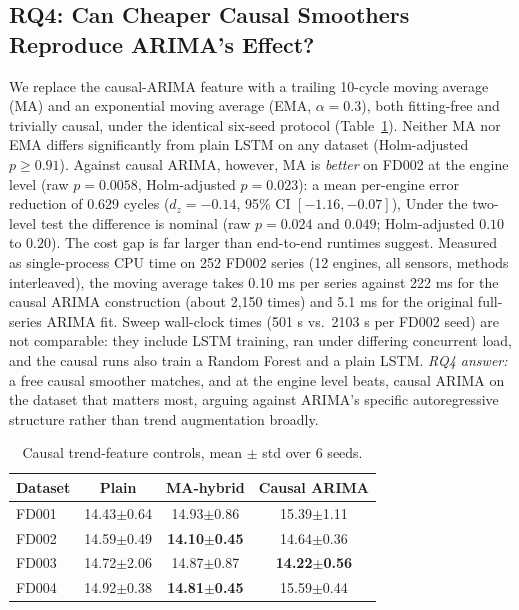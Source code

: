 \documentclass[conference]{IEEEtran}
\begin{document}
\subsection{RQ4: Can Cheaper Causal Smoothers Reproduce ARIMA's Effect?}
We replace the causal-ARIMA feature with a trailing 10-cycle moving average (MA) and an exponential moving average (EMA, $\alpha=0.3$), both fitting-free and trivially causal, under the identical six-seed protocol (Table~\ref{tab:controls}). Neither MA nor EMA differs significantly from plain LSTM on any dataset (Holm-adjusted $p\geq0.91$). Against causal ARIMA, however, MA is \emph{better} on FD002 at the engine level (raw $p=0.0058$, Holm-adjusted $p=0.023$): a mean per-engine error reduction of 0.629 cycles ($d_z=-0.14$, 95\% CI $[-1.16,-0.07]$), Under the two-level test the difference is nominal (raw $p=0.024$ and $0.049$; Holm-adjusted $0.10$ to $0.20$). The cost gap is far larger than end-to-end runtimes suggest. Measured as single-process CPU time on 252 FD002 series (12 engines, all sensors, methods interleaved), the moving average takes 0.10 ms per series against 222 ms for the causal ARIMA construction (about 2{,}150 times) and 5.1 ms for the original full-series ARIMA fit. Sweep wall-clock times (501 s vs.\ 2103 s per FD002 seed) are not comparable: they include LSTM training, ran under differing concurrent load, and the causal runs also train a Random Forest and a plain LSTM. \emph{RQ4 answer:} a free causal smoother matches, and at the engine level beats, causal ARIMA on the dataset that matters most, arguing against ARIMA's specific autoregressive structure rather than trend augmentation broadly.

\begin{table}[t]
\centering
\caption{Causal trend-feature controls, mean $\pm$ std over 6 seeds.}
\label{tab:controls}
\footnotesize
\begin{tabular}{lccc}
\toprule
Dataset & Plain & MA-hybrid & Causal ARIMA \\
\midrule
FD001 & 14.43{\tiny$\pm$0.64} & 14.93{\tiny$\pm$0.86} & 15.39{\tiny$\pm$1.11} \\
FD002 & 14.59{\tiny$\pm$0.49} & \textbf{14.10{\tiny$\pm$0.45}} & 14.64{\tiny$\pm$0.36} \\
FD003 & 14.72{\tiny$\pm$2.06} & 14.87{\tiny$\pm$0.87} & \textbf{14.22{\tiny$\pm$0.56}} \\
FD004 & 14.92{\tiny$\pm$0.38} & \textbf{14.81{\tiny$\pm$0.45}} & 15.59{\tiny$\pm$0.44} \\
\bottomrule
\end{tabular}
\end{table}
\end{document}
